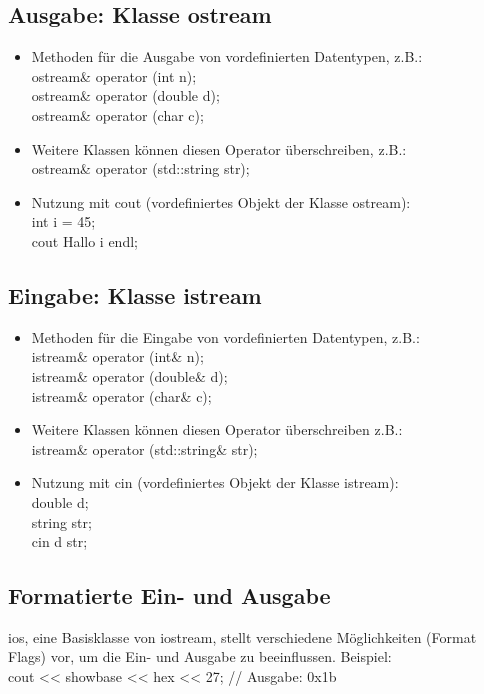 \begin{multicols}{2}
\subsection{Ausgabe: Klasse ostream}
\label{sec:ostream}
\begin{itemize}
	\item Methoden für die Ausgabe von vordefinierten Datentypen, z.B.:
		\\ ostream\& operator \flq\flq(int n);
		\\ ostream\& operator \flq\flq(double d);
		\\ ostream\& operator \flq\flq(char c);
	\item Weitere Klassen können diesen Operator überschreiben, z.B.:
		\\ ostream\& operator \flq\flq(std::string str);
	\item Nutzung mit cout (vordefiniertes Objekt der Klasse ostream):
		\\ int i = 45;
		\\cout \flq\flq \grqq Hallo  \grqq \flq\flq i \flq\flq endl;
\end{itemize}
\vfill\null
\columnbreak
\subsection{Eingabe: Klasse istream}
\label{sec:istream}
\begin{itemize}
	\item Methoden für die Eingabe von vordefinierten Datentypen, z.B.:
		\\ istream\& operator \frq\frq(int\& n);
		\\ istream\& operator \frq\frq(double\& d);
		\\ istream\& operator \frq\frq(char\& c);
	\item Weitere Klassen können diesen Operator überschreiben z.B.:
		\\ istream\& operator \frq\frq(std::string\& str);
	\item Nutzung mit cin (vordefiniertes Objekt der Klasse istream):
		\\ double d;
		\\ string str;
		\\ cin \frq\frq d \frq\frq str;
\end{itemize}
\end{multicols}

\subsection{Formatierte Ein- und Ausgabe}
\label{sec:Formatierte Ein- und Ausgabe}
ios, eine Basisklasse von iostream, stellt verschiedene Möglichkeiten (Format Flags) vor, um die Ein- und Ausgabe zu beeinflussen.
Beispiel:\\
cout << \color{red}showbase\color{black} << \color{green}hex\color{black} << 27;	// Ausgabe: \color{red}0x\color{green}1b \color{black}
\vfill
\pagebreak\newpage

